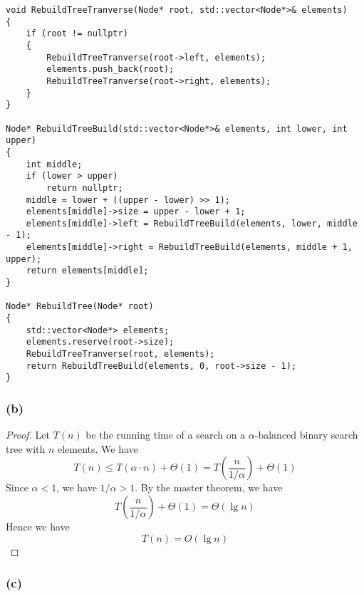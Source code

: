 \begin{verbatim}
void RebuildTreeTranverse(Node* root, std::vector<Node*>& elements)
{
    if (root != nullptr)
    {
        RebuildTreeTranverse(root->left, elements);
        elements.push_back(root);
        RebuildTreeTranverse(root->right, elements);
    }
}

Node* RebuildTreeBuild(std::vector<Node*>& elements, int lower, int upper)
{
    int middle;
    if (lower > upper)
        return nullptr;
    middle = lower + ((upper - lower) >> 1);
    elements[middle]->size = upper - lower + 1;
    elements[middle]->left = RebuildTreeBuild(elements, lower, middle - 1);
    elements[middle]->right = RebuildTreeBuild(elements, middle + 1, upper);
    return elements[middle];
}

Node* RebuildTree(Node* root)
{
    std::vector<Node*> elements;
    elements.reserve(root->size);
    RebuildTreeTranverse(root, elements);
    return RebuildTreeBuild(elements, 0, root->size - 1);
}
\end{verbatim}

\subsubsection*{(b)}

\begin{proof}
    Let $T(n)$ be the running time of a search on 
    a $\alpha$-balanced binary search tree with $n$ elements.
    We have
    \begin{equation*}
        T(n) \leq T(\alpha \cdot n) + \Theta(1)
        = T(\frac{n}{1/\alpha}) + \Theta(1)
    \end{equation*}
    Since $\alpha < 1$, we have $1/\alpha > 1$.
    By the master theorem,
    we have
    \begin{equation*}
        T(\frac{n}{1/\alpha}) + \Theta(1) = \Theta(\lg n)
    \end{equation*}
    Hence we have
    \begin{equation*}
        T(n) = O(\lg n)
    \end{equation*}
\end{proof}

\subsubsection*{(c)}

